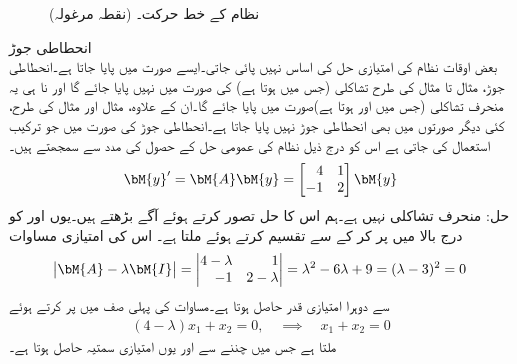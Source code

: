\begin{figure}
\centering
{}
\caption{نظام  کے خط حرکت۔ (نقطہ مرغولہ)}
\label{شکل_نظام_نقطہ_مرغولہ}
\end{figure}
\quad انحطاطی جوڑ\\
بعض اوقات نظام کی امتیازی حل کی اساس نہیں پائی جاتی۔ایسے صورت میں  پایا جاتا ہے۔انحطاطی جوڑ، مثال  تا مثال  کی طرح تشاکلی  (جس میں  ہوتا ہے) کی صورت میں نہیں پایا جائے گا اور نا ہی یہ منحرف تشاکلی (جس میں  اور  ہوتا ہے)صورت میں پایا جائے  گا۔ان کے علاوہ، مثال  اور مثال  کی طرح،  کئی دیگر صورتوں میں بھی انحطاطی جوڑ نہیں پایا جاتا ہے۔انحطاطی جوڑ کی صورت میں جو ترکیب استعمال کی جاتی ہے اس کو درج ذیل نظام  کی عمومی حل کے حصول کی مدد سے سمجھتے ہیں۔
\begin{align}\label{مساوات_نظام_انحطاطی_جوڑ_الف}
\bM{y}'=\bM{A}\bM{y}=\begin{bmatrix*}[r] 4 & 1 \\ -1 & 2 \end{bmatrix*}\bM{y}
\end{align}
حل: منحرف تشاکلی نہیں ہے۔ہم اس کا حل  تصور کرتے ہوئے آگے بڑھتے ہیں۔یوں  اور  کو درج بالا میں پر کر کے  سے تقسیم کرتے ہوئے  ملتا ہے۔ اس کی امتیازی مساوات
\begin{align*}
\abs{\bM{A}-\lambda \bM{I}}=\begin{vmatrix*}[r] 4-\lambda& 1\\-1&2-\lambda \end{vmatrix*}=\lambda^2-6\lambda+9=(\lambda-3)^2=0
\end{align*}
سے دوہرا امتیازی قدر  حاصل ہوتا ہے۔مساوات  کی پہلی صف میں  پر کرتے ہوئے
\begin{align*}
(4-\lambda)x_1+x_2=0, \quad \implies \quad x_1+x_2=0
\end{align*}
ملتا ہے جس میں  چننے سے  اور یوں امتیازی سمتیہ  حاصل ہوتا ہے۔

